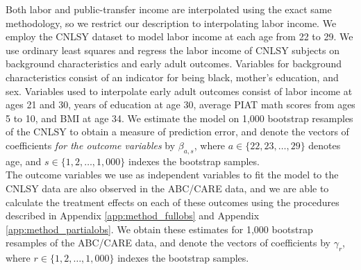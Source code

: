 \noindent Both labor and public-transfer income are interpolated using the exact same methodology, so we restrict
our description to interpolating labor income. We employ the CNLSY dataset to model labor
income at each age from 22 to 29. We use ordinary least squares and regress the labor income of
CNLSY subjects on background characteristics and early adult outcomes. Variables for background
characteristics consist of an indicator for being  black, mother's education, and sex. Variables
used to interpolate early adult outcomes consist of labor income at ages 21 and 30, years of education at age 30, average
PIAT math scores from ages 5 to 10, and BMI at age 34. We estimate the model on 1,000 bootstrap
resamples of the CNLSY to obtain a measure of prediction error, and denote the vectors of coefficients
\emph{for the outcome variables} by $\beta_{a,s}$, where $a \in \{22, 23, \dots, 29\}$ denotes age, and
$s \in \{1,2,\dots, 1,000\}$ indexes the bootstrap samples. \\

\noindent The outcome variables we use as independent variables to fit the model to the CNLSY data are also
observed in the ABC/CARE data, and we are able to calculate the treatment effects on each of these outcomes
using the procedures described in Appendix \ref{app:method_fullobs} and Appendix \ref{app:method_partialobs}. We
obtain these estimates for 1,000 bootstrap resamples of the ABC/CARE data, and denote the vectors of
coefficients by $\gamma_r$, where $r \in \{1,2,\dots,1,000\}$ indexes the bootstrap samples. \\


